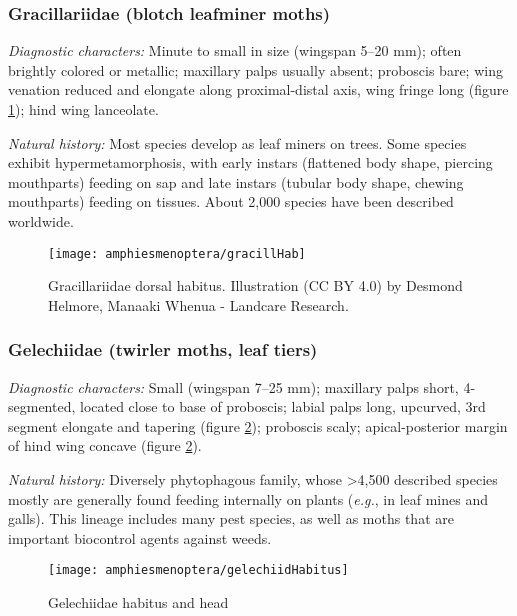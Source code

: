 \subsubsection{Gracillariidae (blotch leafminer moths)}
\noindent{}\textit{Diagnostic characters:} Minute to small in size (wingspan 5--20 mm); often brightly colored or metallic; maxillary palps usually absent; proboscis bare; wing venation reduced and elongate along proximal-distal axis, wing fringe long (figure \ref{fig:gracill2}); hind wing lanceolate.\vspace{3mm}

\noindent{}\textit{Natural history:} Most species develop as leaf miners on trees. Some species exhibit hypermetamorphosis, with early instars (flattened body shape, piercing mouthparts) feeding on sap and late instars (tubular body shape, chewing mouthparts) feeding on tissues. About 2,000 species have been described worldwide.

\begin{figure}[ht!]
  \centering
    \texttt{[image: amphiesmenoptera/gracillHab]}
  \caption{Gracillariidae dorsal habitus. Illustration (CC BY 4.0) by Desmond Helmore, Manaaki Whenua - Landcare Research.}
  \label{fig:gracill2}
\end{figure}

\subsubsection{Gelechiidae (twirler moths, leaf tiers)}
\noindent{}\textit{Diagnostic characters:} Small (wingspan 7--25 mm); maxillary palps short, 4-segmented, located close to base of proboscis; labial palps long, upcurved, 3rd segment elongate and tapering (figure \ref{fig:gelechiid1}); proboscis scaly; apical-posterior margin of hind wing concave (figure \ref{fig:gelechiid1}).\vspace{3mm}

\noindent{}\textit{Natural history:} Diversely phytophagous family, whose \textgreater4,500 described species mostly are generally found feeding internally on plants (\textit{e.g.}, in leaf mines and galls). This lineage includes many pest species, as well as moths that are important biocontrol agents against weeds. 

\begin{figure}[ht!]
  \centering
    \texttt{[image: amphiesmenoptera/gelechiidHabitus]}
  \caption{Gelechiidae habitus and head \citep[modified from][Fig. 4]{bhlitem190298gelechiid}}
  \label{fig:gelechiid1}
\end{figure}

